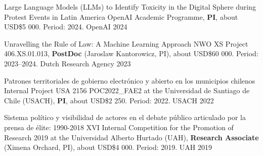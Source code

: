 \begin{cvhonors}
\cvhonor
{Large Language Models (LLMs) to Identify Toxicity in the Digital Sphere during Protest Events in Latin America}
{OpenAI Academic Programme, {\bfseries PI}, about USD\$5 000. Period: 2024.}
{OpenAI}
{2024}
\end{cvhonors}

\vspace{1mm}

\begin{cvhonors}
\cvhonor
{Unravelling the Rule of Law: A Machine Learning Approach}
{NWO XS Project 406.XS.01.013, {\bfseries PostDoc} (Jaroslaw Kantorowicz, PI), about USD\$60 000. Period: 2023--2024.} %
{Dutch Research Agency}
{2023}
\end{cvhonors}

\vspace{1mm}

\begin{cvhonors}
\cvhonor
{Patrones territoriales de gobierno electrónico y abierto en los municipios chilenos}
{Internal Project USA 2156 POC2022\_FAE2 at the Universidad de Santiago de Chile (USACH), {\bfseries PI}, about USD\$2 250. Period: 2022.} %
{USACH}
{2022}
\end{cvhonors}

\vspace{1mm}

\begin{cvhonors}
\cvhonor
{Sistema político y visibilidad de actores en el debate público articulado por la prensa de élite: 1990-2018}
{XVI Internal Competition for the Promotion of Research 2019 at the Universidad Alberto Hurtado (UAH), {\bfseries Research Associate} (Ximena Orchard, PI), about USD\$4 000. Period: 2019.} %
{UAH}
{2019}
\end{cvhonors}

\vspace{1mm}

